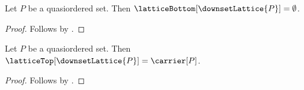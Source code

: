 \begin{proposition}\label{downset_lattice_bottom}
    Let $P$ be a quasiordered set.
    Then $\latticeBottom[\downsetLattice{P}]=\emptyset$.
\end{proposition}
\begin{proof}
    Follows by
        .
\end{proof}

\begin{proposition}\label{downset_lattice_top}
    Let $P$ be a quasiordered set.
    Then $\latticeTop[\downsetLattice{P}]=\carrier[P]$.
\end{proposition}
\begin{proof}
    Follows by
        .
\end{proof}
